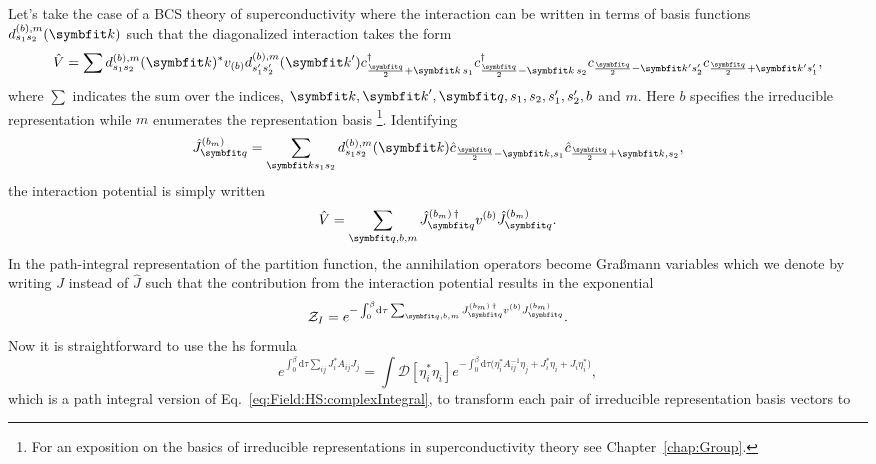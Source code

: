 Let's take the case of a BCS theory of superconductivity where the interaction can be written in terms of
basis functions $d^{(b),m}_{s_1s_2}(\v{k})$ such that the diagonalized interaction takes the form
\begin{equation}
    \label{eq:Field:HS:Symm:diagonalizedV}
    \hat{V} = \sum d^{(b),m}_{s_1s_2}(\v{k})^\ast v_{(b)}d^{(b),m}_{s_1's_2'}(\v{k}') c_{\frac{\v{q}}{2}+\v{k}\,s_1}^\dagger c_{\frac{\v{q}}{2}-\v{k}\,s_2}^\dagger c_{\frac{\v{q}}{2}-\v{k}'s_2'}c_{\frac{\v{q}}{2}+\v{k}'s_1'},
\end{equation}
where $\sum$ indicates the sum over the indices, $\v{k}, \v{k}', \v{q}, s_1, s_2, s_1', s_2', b$ and $m$. Here $b$ specifies the irreducible representation
while $m$ enumerates the representation basis \footnote{For an exposition on the basics of irreducible representations in superconductivity theory see Chapter~\ref{chap:Group}.}.
Identifying
\begin{equation}
    \label{eq:Field:HS:Symm:identification}
    \hat{J}_\v{q}^{(b_m)} = \sum_{\v{k}s_1s_2}d^{(b),m}_{s_1s_2}(\v{k})\hat{c}_{\frac{\v{q}}{2}-\v{k},s_1}\hat{c}_{\frac{\v{q}}{2}+\v{k},s_2},
\end{equation}
the interaction potential is simply written
\begin{equation}
    \label{eq:Field:HS:Symm:HSpreparedV}
    \hat{V} = \sum_{\v{q},b,m}\hat{J}_\v{q}^{(b_m)\,\dagger}v^{(b)}\hat{J}_\v{q}^{(b_m)}.
\end{equation}
In the path-integral representation of the partition function, the annihilation operators become Gra\ss mann variables which we denote
by writing $J$ instead of $\hat{J}$ such that the contribution from the interaction potential results in the exponential
\begin{equation}
    \label{eq:Field:HS:Symm:potentialExp}
    \mathcal{Z}_I = e^{-\int_0^\beta\!\mathrm{d}\tau\sum_{\v{q},b,m}J_\v{q}^{(b_m)\,\dagger}v^{(b)}J_\v{q}^{(b_m)}}.
\end{equation}
Now it is straightforward to use the \ac{hs} formula
\begin{equation}
    \label{eq:Field:HS:Symm:fieldHSTransform}
    e^{\int_0^\beta\!\mathrm{d}\tau\sum_{ij} J_i^\ast A_{ij}J_{j}} = \int\!\mathcal{D}[\eta_i^\ast\eta_i]e^{-\int_0^\beta\!\mathrm{d}\tau\big(\eta_i^\ast A^{-1}_{ij}\eta_j + J_i^\ast\eta_i+J_i\eta_i^\ast\big)},
\end{equation}
which is a path integral version of Eq.~\eqref{eq:Field:HS:complexIntegral}, to transform each pair of irreducible representation basis vectors to
